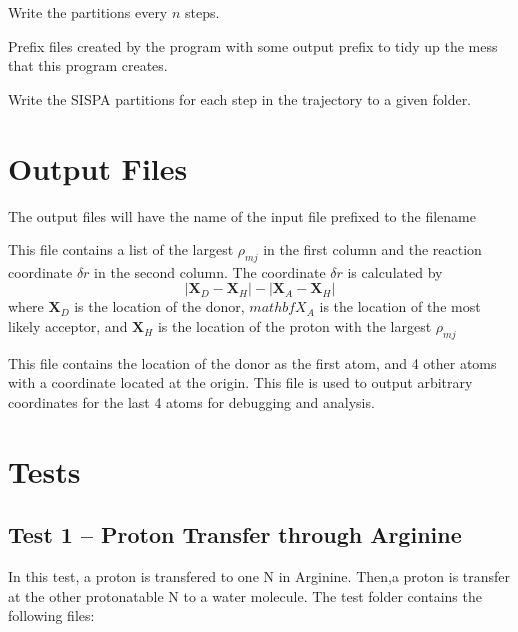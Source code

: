 \documentclass{article}
\begin{document}
\begin{description}[style=unboxed, labelwidth=\linewidth, font =\sffamily\itshape\bfseries, listparindent =0pt, before =\sffamily]
\item[write\_n\_steps (int)]
Write the partitions every $n$ steps.

\item[write\_prefix (desired prefix)]
Prefix files created by the program with some output prefix to tidy up the mess that this program creates.

\item[write\_sispa (folder)]
Write the SISPA partitions for each step in the trajectory to a given folder.

\end{description}

\section{Output Files}
The output files will have the name of the input file prefixed to the filename
\begin{description}[style=unboxed, labelwidth=\linewidth, font =\sffamily\itshape\bfseries, listparindent =0pt, before =\sffamily]

\item[-indicator.log]
This file contains a list of the largest $\rho_{mj}$ in the first column and the reaction coordinate $\delta r$ in the second column.
The coordinate $\delta r$ is calculated by
\begin{equation}\label{eq:dr}
| \mathbf{X}_D - \mathbf{X}_H | - | \mathbf{X}_A - \mathbf{X}_H |
\end{equation}
where $\mathbf{X}_D$ is the location of the donor, $mathbf{X}_A$ is the location of the most likely acceptor, and $\mathbf{X}_H$ is the location of the proton with the largest $\rho_{mj}$

\item[-donor.xyz]
This file contains the location of the donor as the first atom, and 4 other atoms with a coordinate located at the origin.
This file is used to output arbitrary coordinates for the last 4 atoms for debugging and analysis.
\end{description}


\section{Tests}

\subsection{Test 1 -- Proton Transfer through Arginine}
In this test, a proton is transfered to one N in Arginine.
Then,a proton is transfer at the other protonatable N to a water molecule.
The test folder contains the following files:
\end{document}
